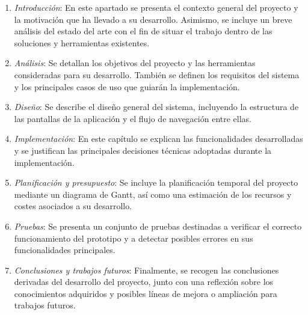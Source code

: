 \documentclass[../../main.tex]{subfiles}
\begin{document}
\begin{enumerate}
    \item \textit{Introducción}: En este apartado se presenta el contexto general del proyecto y la motivación que ha llevado a su desarrollo. Asimismo, se incluye un breve análisis del estado del arte con el fin de situar el trabajo dentro de las soluciones y herramientas existentes.
   
    \item \textit{Análisis}: Se detallan los objetivos del proyecto y las herramientas consideradas para su desarrollo. También se definen los requisitos del sistema y los principales casos de uso que guiarán la implementación.

    \item \textit{Diseño}: Se describe el diseño general del sistema, incluyendo la estructura de las pantallas de la aplicación y el flujo de navegación entre ellas.

    \item \textit{Implementación}: En este capítulo se explican las funcionalidades desarrolladas y se justifican las principales decisiones técnicas adoptadas durante la implementación.

    \item \textit{Planificación y presupuesto}: Se incluye la planificación temporal del proyecto mediante un diagrama de Gantt, así como una estimación de los recursos y costes asociados a su desarrollo.
    
    \item \textit{Pruebas}: Se presenta un conjunto de pruebas destinadas a verificar el correcto funcionamiento del prototipo y a detectar posibles errores en sus funcionalidades principales.

    \item \textit{Conclusiones y trabajos futuros}: Finalmente, se recogen las conclusiones derivadas del desarrollo del proyecto, junto con una reflexión sobre los conocimientos adquiridos y posibles líneas de mejora o ampliación para trabajos futuros.

\end{enumerate}
\end{document}
